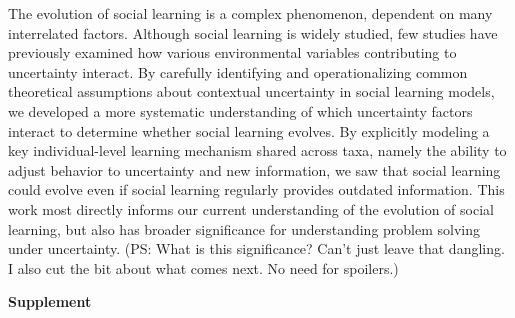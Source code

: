 \documentclass[letterpaper,11.5pt]{scrartcl}
\newcommand{\ps}[1]{{\textcolor{mygreen} {({\tiny PS:} #1)}}}
\begin{document}
The evolution of social learning is a complex phenomenon, dependent on many interrelated factors. Although social learning is widely studied, few studies have previously examined how various environmental variables contributing to uncertainty interact. 
By carefully identifying and operationalizing common theoretical assumptions about contextual uncertainty in social learning models, we developed a more systematic
understanding of which uncertainty factors interact to determine whether social
learning evolves. By explicitly modeling a key individual-level learning mechanism
shared across taxa, namely the ability to adjust behavior to uncertainty and new
information, we saw that social learning could evolve even if social learning
regularly provides outdated information. This work most directly informs our current understanding of the evolution of social learning, but also has broader significance for
understanding problem solving under uncertainty. \ps{What is this significance? Can't just leave that dangling. I also cut the bit about what comes next. No need for spoilers.} 



% 



\pagebreak
\begin{center}
  \textbf{\Large \textsf{Supplement}}
\end{center}
\setcounter{equation}{1}
\setcounter{figure}{0}
\setcounter{section}{0}
\setcounter{table}{0}
\setcounter{page}{1}
\makeatletter
\renewcommand{\theequation}{S\arabic{equation}}
\renewcommand{\thefigure}{S\arabic{figure}}
\renewcommand{\thetable}{S\arabic{table}}
\renewcommand{\thesection}{S\arabic{section}}
\renewcommand{\thepage}{S\arabic{page}}
\end{document}
